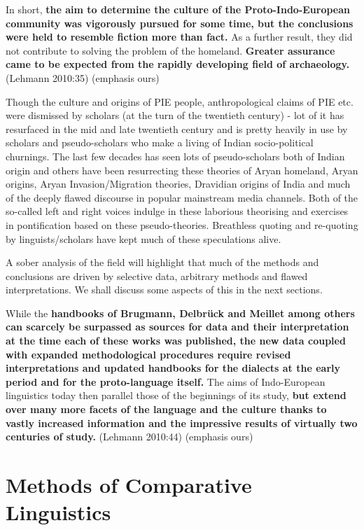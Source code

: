 \begin{myquote}
In short, \textbf{the aim to determine the culture of the Proto-Indo-European community was vigorously pursued for some time, but the conclusions were held to resemble fiction more than fact.} As a further result, they did not contribute to solving the problem of the homeland. \textbf{Greater assurance came to be expected from the rapidly developing field of archaeology.} (Lehmann 2010:35) (emphasis ours)
\end{myquote}

Though the culture and origins of PIE people, anthropological claims of PIE etc. were dismissed by scholars (at the turn of the twentieth century) - lot of it has resurfaced in the mid and late twentieth century and is pretty heavily in use by scholars and pseudo-scholars who make a living of Indian socio-political churnings. The last few decades has seen lots of pseudo-scholars both of Indian origin and others have been resurrecting these theories of Aryan homeland, Aryan origins, Aryan Invasion/Migration theories, Dravidian origins of India and much of the deeply flawed discourse in popular mainstream media channels. Both of the so-called left and right voices indulge in these laborious theorising and exercises in pontification based on these pseudo-theories. Breathless quoting and re-quoting by linguists/scholars have kept much of these speculations alive.

A sober analysis of the field will highlight that much of the methods and conclusions are driven by selective data, arbitrary methods and flawed interpretations. We shall discuss some aspects of this in the next sections.

\begin{myquote}
While the \textbf{handbooks of Brugmann, Delbrück and Meillet among others can scarcely be surpassed as sources for data and their interpretation at the time each of these works was published, the new data coupled with expanded methodological procedures require revised interpretations and updated handbooks for the dialects at the early period and for the proto-language itself.} The aims of Indo-European linguistics today then parallel those of the beginnings of its study, \textbf{but extend over many more facets of the language and the culture thanks to vastly increased information and the impressive results of virtually two centuries of study.} (Lehmann 2010:44) (emphasis ours)
\end{myquote}


\section*{Methods of Comparative Linguistics}

